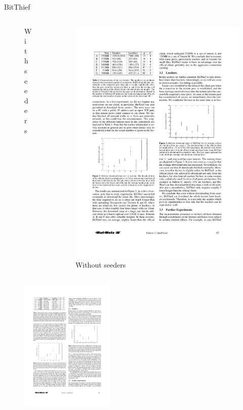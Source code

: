 \begin{frame}{BitThief}
\begin{columns}
\begin{column}{0.40\textwidth}
\begin{figure}
	\caption{With seeders}
\end{figure}
\end{column}
\begin{column}{0.40\textwidth}
\begin{figure}
	\includegraphics[width=\textwidth]{figs/10/bitthief3}
	\caption{Without seeders}
\end{figure}
\end{column}
\end{columns}

\begin{figure}
	\includegraphics[width=0.4\textwidth]{figs/10/bitthief4}
\end{figure}

\end{frame}

